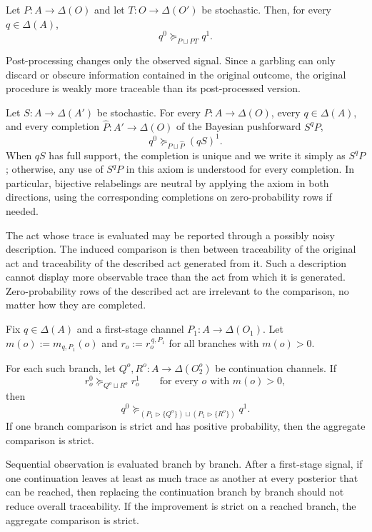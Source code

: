 \documentclass[11pt,a4paper]{article}
\theoremstyle{definition}
\newcommand{\1}{\mathbf 1}
\begin{document}
\begin{description}[leftmargin=*,style=sameline]
\item[(A4) Outcome post-processing aversion.]
Let $P:A\to\Delta(O)$ and let $T:O\to\Delta(O')$ be stochastic.  Then, for every $q\in\Delta(A)$,
\[
q^0\succeq_{P\sqcup PT}q^1.
\]

Post-processing changes only the observed signal.  Since a garbling can only discard or obscure information contained in
the original outcome, the original procedure is weakly more traceable than its post-processed version.

\item[(A5) Action-coarsening aversion.]
Let $S:A\to\Delta(A')$ be stochastic.  For every $P:A\to\Delta(O)$, every $q\in\Delta(A)$, and every completion
$\widehat P:A'\to\Delta(O)$ of the Bayesian pushforward $S^qP$,
\[
q^0\succeq_{P\sqcup \widehat P}(qS)^1.
\]
When $qS$ has full support, the completion is unique and we write it simply as $S^qP$; otherwise, any use of $S^qP$ in this
axiom is understood for every completion.  In particular, bijective relabelings are neutral by applying the axiom in both
directions, using the corresponding completions on zero-probability rows if needed.

The act whose trace is evaluated may be reported through a possibly noisy description.  The induced comparison is then
between traceability of the original act and traceability of the described act generated from it.  Such a description
cannot display more observable trace than the act from which it is generated.  Zero-probability rows of the described act
are irrelevant to the comparison, no matter how they are completed.

\item[(A6) Branchwise continuation monotonicity.]
Fix $q\in\Delta(A)$ and a first-stage channel $P_1:A\to\Delta(O_1)$.  Let
$m(o):=m_{q,P_1}(o)$ and $r_o:=r_o^{\,q,P_1}$ for all branches with $m(o)>0$.

For each such branch, let $Q^o,R^o:A\to\Delta(O_2^o)$ be continuation channels.  If
\[
r_o^0\succeq_{Q^o\sqcup R^o}r_o^1
\qquad\text{for every }o\text{ with }m(o)>0,
\]
then
\[
q^0
\succeq_{(P_1\triangleright\{Q^o\})\sqcup(P_1\triangleright\{R^o\})}
q^1.
\]
If one branch comparison is strict and has positive probability, then the aggregate comparison is strict.

Sequential observation is evaluated branch by branch.  After a first-stage signal, if one continuation leaves at least as
much trace as another at every posterior that can be reached, then replacing the continuation branch by branch should not
reduce overall traceability.  If the improvement is strict on a reached branch, the aggregate comparison is strict.


\end{description}
\end{document}
